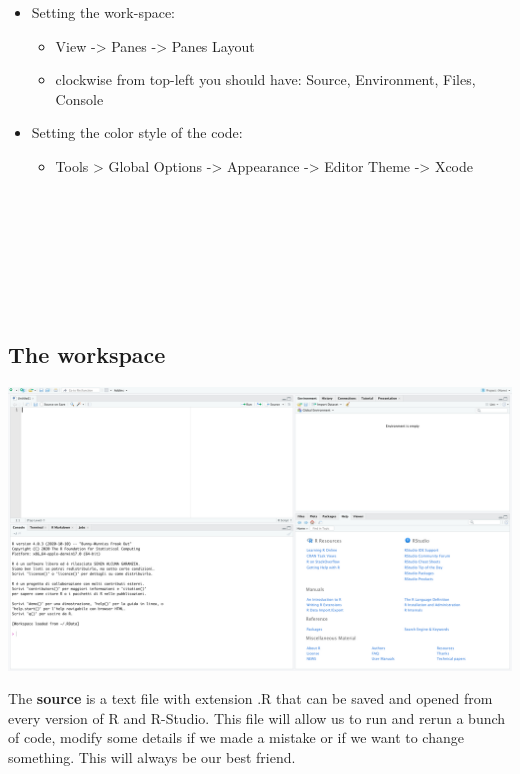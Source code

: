 \documentclass[
]{article}
\providecommand{\tightlist}{%
  \setlength{\itemsep}{0pt}\setlength{\parskip}{0pt}}
\begin{document}
\begin{itemize}
\item
  Setting the work-space:

  \begin{itemize}
  \tightlist
  \item
    View -\textgreater{} Panes -\textgreater{} Panes Layout\\
  \item
    clockwise from top-left you should have: Source, Environment,
    Files, Console
  \end{itemize}
\item
  Setting the color style of the code:

  \begin{itemize}
  \tightlist
  \item
    Tools \textgreater{} Global Options -\textgreater{} Appearance -\textgreater{} Editor Theme -\textgreater{}
    Xcode
  \end{itemize}
\end{itemize}

~

~

~

~

\hypertarget{the-workspace}{%
\subsection{The workspace}\label{the-workspace}}

\begin{center}\includegraphics[width=0.8\linewidth,]{images/workspace} \end{center}

The \textbf{source} is a text file with extension .R that can be saved and
opened from every version of R and R-Studio. This file will allow us to
run and rerun a bunch of code, modify some details if we made a mistake
or if we want to change something. This will always be our best friend.
\end{document}
